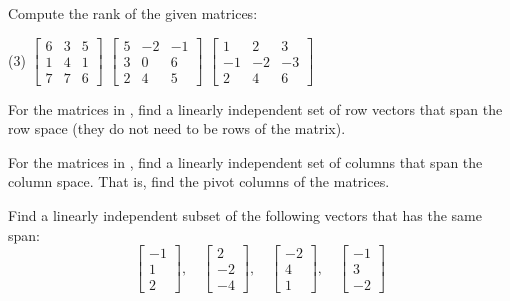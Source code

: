 \begin{exercise} \label{exercise:rankmatrix}
Compute the rank of the given matrices:
\begin{tasks}(3)
\task
$\begin{bmatrix}
6 & 3 & 5 \\
1 & 4 & 1 \\
7 & 7 & 6
\end{bmatrix}$
\task
$\begin{bmatrix}
5 & -2 & -1 \\
3 & 0 & 6 \\
2 & 4 & 5
\end{bmatrix}$
\task
$\begin{bmatrix}
1 & 2 & 3 \\
-1 & -2 & -3 \\
2 & 4 & 6
\end{bmatrix}$
\end{tasks}
\end{exercise}

\begin{exercise}
For the matrices in , find
a linearly independent set of row vectors that span the row space
(they do not need to be rows of the matrix).
\end{exercise}

\begin{exercise}
For the matrices in , find
a linearly independent set of columns that span the column space.
That is, find the pivot columns of the matrices.
\end{exercise}

\begin{exercise}
Find a linearly independent subset of the following vectors that has
the same span:
\begin{equation*}
\begin{bmatrix}
-1 \\ 1 \\ 2
\end{bmatrix}
, \quad
\begin{bmatrix}
2 \\ -2 \\ -4
\end{bmatrix}
, \quad
\begin{bmatrix}
-2 \\ 4 \\ 1
\end{bmatrix}
, \quad
\begin{bmatrix}
-1 \\ 3 \\ -2
\end{bmatrix}
\end{equation*}
\end{exercise}

